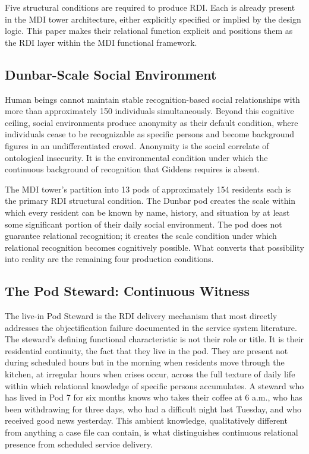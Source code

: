 \documentclass[12pt, letterpaper]{article}
\begin{document}
Five structural conditions are required to produce RDI. Each is already present in the MDI tower architecture, either explicitly specified or implied by the design logic. This paper makes their relational function explicit and positions them as the RDI layer within the MDI functional framework.

\subsection{Dunbar-Scale Social Environment}

Human beings cannot maintain stable recognition-based social relationships with more than approximately 150 individuals simultaneously. Beyond this cognitive ceiling, social environments produce anonymity as their default condition, where individuals cease to be recognizable as specific persons and become background figures in an undifferentiated crowd. Anonymity is the social correlate of ontological insecurity. It is the environmental condition under which the continuous background of recognition that Giddens requires is absent.

The MDI tower's partition into 13 pods of approximately 154 residents each is the primary RDI structural condition. The Dunbar pod creates the scale within which every resident can be known by name, history, and situation by at least some significant portion of their daily social environment. The pod does not guarantee relational recognition; it creates the scale condition under which relational recognition becomes cognitively possible. What converts that possibility into reality are the remaining four production conditions.

\subsection{The Pod Steward: Continuous Witness}

The live-in Pod Steward is the RDI delivery mechanism that most directly addresses the objectification failure documented in the service system literature. The steward's defining functional characteristic is not their role or title. It is their residential continuity, the fact that they live in the pod. They are present not during scheduled hours but in the morning when residents move through the kitchen, at irregular hours when crises occur, across the full texture of daily life within which relational knowledge of specific persons accumulates. A steward who has lived in Pod 7 for six months knows who takes their coffee at 6 a.m., who has been withdrawing for three days, who had a difficult night last Tuesday, and who received good news yesterday. This ambient knowledge, qualitatively different from anything a case file can contain, is what distinguishes continuous relational presence from scheduled service delivery.
\end{document}
